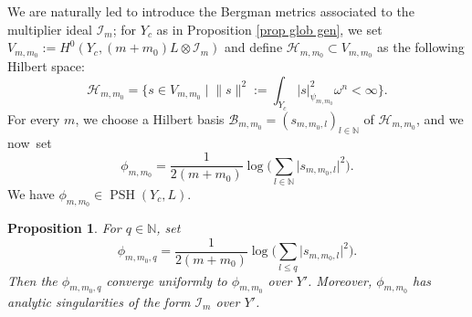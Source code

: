 \documentclass[JEP,XML,SOM,Unicode,published]{cedram}
\let\ts\textstyle
\let\sep\mid
\newtheorem{prop}[equation]{Proposition}
\theoremstyle{definition}
\newcommand \N{\mathbb N}
\DeclareMathOperator{\PSH}{PSH}
\begin{document}
We are naturally led to introduce the Bergman metrics associated to the multiplier ideal $\mathscr{I}_m$; for $Y_c$ as in Proposition \ref{prop glob gen}, we set $V_{m, m_0}:= H^0(Y_c, (m+m_0)L \otimes \mathscr{I}_{m})$ and define $ \mathscr{H}_{m, m_0} \subset V_{m, m_0}$ as the following Hilbert space:
\[
\mathscr{H}_{m, m_0} = \bigl\{ s \in V_{m, m_0} \sep\ts \lVert s \rVert^2:= \int_{Y_c} \lvert s \rvert^2_{\psi_{m, m_0}} \omega^{n} < \infty \bigr\}.
\]
For every $m$, we choose a Hilbert basis $\mathscr{B}_{m, m_0} = (s_{m, m_0, l})_{l \in \N}$ of $ \mathscr{H}_{m, m_0}$, and  we now~set
\[
\phi_{m, m_0} = \frac{1}{2(m+m_0)} \log \bigl(\ts\sum_{l \in \N} \lvert s_{m, m_0, l} \rvert^2\bigr).
\]
We have $\phi_{m, m_0} \in \PSH(Y_c, L)$.

\begin{prop} \label{prop som part}
For $q \in \N$, set
\[
\phi_{m, m_0, q} = \frac{1}{2(m+m_0)} \log \bigl(\ts\sum_{l \le q} \lvert s_{m, m_0, l} \rvert^2\bigr).
\]
Then the $\phi_{m, m_0, q}$ converge uniformly to $\phi_{m, m_0}$ over $Y'$. Moreover, $\phi_{m, m_0}$ has analytic singularities of the form $\mathscr{I}_m$ over $Y'$.
\end{prop}
\end{document}

